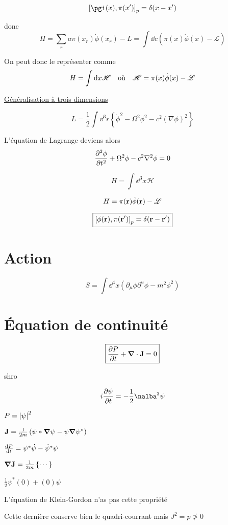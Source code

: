 $$\left[ \pgi(x), \pi(x') \right]_p = \delta (x-x')$$ 


donc $$H= \sum_r a \pi(x_r) \dot\phi (x_r ) -L = \int \dd c \left( \pi (x) \dot\phi(x) - \mathscr{L}  \right) $$ 

On peut donc le représenter comme $$H = \int \dd x \mathscr{H} \qq{où} \mathscr{H} = \pi(x) \dot \phi (x) - \mathscr{L} $$ 


\underline{Généralisation à trois dimensions } 

$$L = \frac{1}{2} \int \dd^{3}r \left\{ \dot \phi^{2}-\Omega ^2 \phi^{2}-c^{2}(\nabla\phi)^2 \right\} $$ 

L'équation de Lagrange deviens alors $$ \pdv[2]{\phi}{t} + \Omega^{2}\phi -c^{2}\nabla^{2}\phi =0$$ 

$$H = \int \dd^{3}x \mathscr{H} $$ 

$$H = \pi(\vb{r}) \dot\phi (\vb{r}) - \mathscr{L} $$ 

$$\boxed{\left[ \phi(\vb{r}), \pi(\vb{r}') \right]_p =\delta(\vb{r}-\vb{r}')}$$ 


\section*{Action}

$$S  = \int \dd^{4}x \left( \partial_{\mu} \phi \partial^{u}\phi - m^{2}\phi^2 \right) $$ 


\section*{Équation de continuité }

$$\boxed{ \pdv{P}{t} + \grad \cdot \vb{J} =0 }$$ 

shro

$$i \pdv{\psi}{t} = - \frac{1}{2} \nalba^{2}\psi$$ 

$P = \abs{\psi}^{2}$ 

$\vb{J} = \frac{1}{2m} \left( \psi* \grad \psi -\psi \grad \psi^{*} \right) $  

$\dv{P}{t} = \psi^{*}\dot\psi - \dot \psi^{*}\psi$ 

$\grad \vb{J} = \frac{1}{2m} \left\{ \dotsb \right\} $

$\frac{1}{2} \psi^{*}(0) + (0)\psi$ 


L'équation de Klein-Gordon n'as pas cette propriété

Cette dernière conserve bien le quadri-courrant mais $J^{2} = p\ngtr 0$ 





